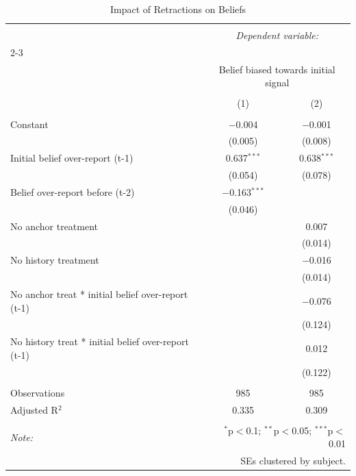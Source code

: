 
\begin{table}[!htbp] \centering 
  \caption{Impact of Retractions on Beliefs} 
  \label{} 
\begin{tabular}{@{\extracolsep{5pt}}lcc} 
\\[-1.8ex]\hline 
\hline \\[-1.8ex] 
 & \multicolumn{2}{c}{\textit{Dependent variable:}} \\ 
\cline{2-3} 
\\[-1.8ex] & \multicolumn{2}{c}{Belief biased towards initial signal} \\ 
\\[-1.8ex] & (1) & (2)\\ 
\hline \\[-1.8ex] 
 Constant & $-$0.004 & $-$0.001 \\ 
  & (0.005) & (0.008) \\ 
  Initial belief over-report (t-1) & 0.637$^{***}$ & 0.638$^{***}$ \\ 
  & (0.054) & (0.078) \\ 
  Belief over-report before (t-2) & $-$0.163$^{***}$ &  \\ 
  & (0.046) &  \\ 
  No anchor treatment &  & 0.007 \\ 
  &  & (0.014) \\ 
  No history treatment &  & $-$0.016 \\ 
  &  & (0.014) \\ 
  No anchor treat * initial belief over-report (t-1) &  & $-$0.076 \\ 
  &  & (0.124) \\ 
  No history treat * initial belief over-report (t-1) &  & 0.012 \\ 
  &  & (0.122) \\ 
 \hline \\[-1.8ex] 
Observations & 985 & 985 \\ 
Adjusted R$^{2}$ & 0.335 & 0.309 \\ 
\hline 
\hline \\[-1.8ex] 
\textit{Note:}  & \multicolumn{2}{r}{$^{*}$p$<$0.1; $^{**}$p$<$0.05; $^{***}$p$<$0.01} \\ 
 & \multicolumn{2}{r}{SEs clustered by subject.} \\ 
\end{tabular} 
\end{table} 
